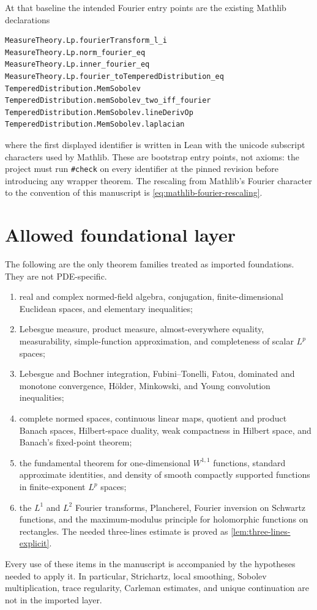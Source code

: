 \documentclass[11pt,oneside]{book}
\theoremstyle{definition}
\theoremstyle{remark}
\newcommand{\1}{\mathbf 1}
\begin{document}
At that baseline the intended Fourier entry points are the existing Mathlib
declarations
\begin{verbatim}
MeasureTheory.Lp.fourierTransform_l_i
MeasureTheory.Lp.norm_fourier_eq
MeasureTheory.Lp.inner_fourier_eq
MeasureTheory.Lp.fourier_toTemperedDistribution_eq
TemperedDistribution.MemSobolev
TemperedDistribution.memSobolev_two_iff_fourier
TemperedDistribution.MemSobolev.lineDerivOp
TemperedDistribution.MemSobolev.laplacian
\end{verbatim}
where the first displayed identifier is written in Lean with the unicode
subscript characters used by Mathlib.  These are bootstrap entry points, not
axioms: the project must run \texttt{\#check} on every identifier at the
pinned revision before introducing any wrapper theorem.  The rescaling
from Mathlib's Fourier character to the convention of this manuscript is
\eqref{eq:mathlib-fourier-rescaling}.

\section{Allowed foundational layer}

The following are the only theorem families treated as imported
foundations.  They are not PDE-specific.
\begin{enumerate}
\item real and complex normed-field algebra, conjugation, finite-dimensional
      Euclidean spaces, and elementary inequalities;
\item Lebesgue measure, product measure, almost-everywhere equality,
      measurability, simple-function approximation, and completeness of
      scalar $L^p$ spaces;
\item Lebesgue and Bochner integration, Fubini--Tonelli, Fatou, dominated and
      monotone convergence, H\"older, Minkowski, and Young convolution
      inequalities;
\item complete normed spaces, continuous linear maps, quotient and product
      Banach spaces, Hilbert-space duality, weak compactness in Hilbert space,
      and Banach's fixed-point theorem;
\item the fundamental theorem for one-dimensional $W^{1,1}$ functions,
      standard approximate identities, and density of smooth compactly
      supported functions in finite-exponent $L^p$ spaces;
\item the $L^1$ and $L^2$ Fourier transforms, Plancherel, Fourier inversion
      on Schwartz functions, and the maximum-modulus principle for holomorphic functions on rectangles.
      The needed three-lines estimate is proved as
      \cref{lem:three-lines-explicit}.
\end{enumerate}
Every use of these items in the manuscript is accompanied by the hypotheses
needed to apply it.  In particular, Strichartz, local smoothing, Sobolev
multiplication, trace regularity, Carleman estimates, and unique continuation
are not in the imported layer.
\end{document}
